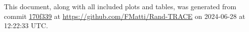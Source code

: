 This document, along with all included plots and tables, was generated from commit \href{https://github.com/FMatti/Rand-TRACE/tree/170f339}{170f339} at \url{https://github.com/FMatti/Rand-TRACE} on 2024-06-28 at 12:22:33 UTC.
